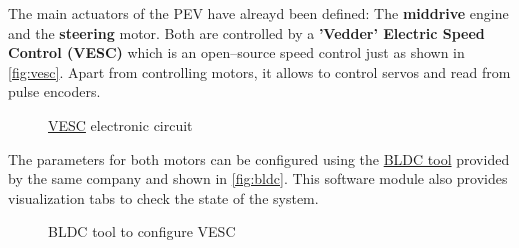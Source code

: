  The main actuators of the PEV have alreayd been defined: The \textbf{middrive} engine and the \textbf{steering} motor. Both are controlled by a \textbf{'Vedder' Electric Speed Control (VESC)} which is an open--source speed control just as shown in \autoref{fig:vesc}. Apart from controlling motors, it allows to control servos and read from pulse encoders.
\begin{figure}[h]
  \centering
  \caption{\href{https://vesc-project.com/}{VESC} electronic circuit}
  \label{fig:vesc}
\end{figure}

The parameters for both motors can be configured using the \href{http://vedder.se/2015/01/vesc-open-source-esc/}{BLDC tool} provided by the same company and shown in \autoref{fig:bldc}. This software module also provides visualization tabs to check the state of the system.
\begin{figure}[h]
  \centering
  \caption{BLDC tool to configure VESC}
  \label{fig:bldc}
\end{figure}

